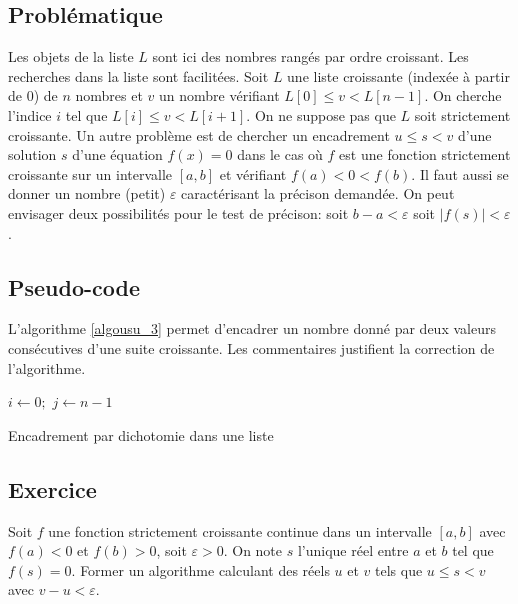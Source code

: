 \subsection{Problématique}
Les objets de la liste $L$ sont ici des nombres rangés par ordre croissant. Les recherches dans la liste sont facilitées.\newline
Soit $L$ une liste croissante (indexée à partir de 0) de $n$ nombres et $v$ un nombre vérifiant $L[0] \leq v < L[n-1]$. On cherche l'indice $i$ tel que $L[i]\leq v < L[i+1]$. On ne suppose pas que $L$ soit strictement croissante.\newline
Un autre problème est de chercher un encadrement $u\leq s < v$ d'une solution $s$ d'une équation $f(x)=0$ dans le cas où $f$ est une fonction strictement croissante sur un intervalle $[a,b]$ et vérifiant $f(a) < 0 < f(b)$. Il faut aussi se donner un nombre (petit) $\varepsilon$ caractérisant la précison demandée. On peut envisager deux possibilités pour le test de précison: soit $b-a < \varepsilon$ soit $|f(s)|< \varepsilon$.
\subsection{Pseudo-code}
L'algorithme \ref{algousu_3} permet d'encadrer un nombre donné par deux valeurs consécutives d'une suite croissante. Les commentaires justifient la correction de l'algorithme.
\begin{algorithm}
  $i\leftarrow 0; $ 
  $j\leftarrow n-1$\;
  \caption{Encadrement par dichotomie dans une liste}
  \label{algousu_3}
\end{algorithm}

\subsection{Exercice}
Soit $f$ une fonction strictement croissante continue dans un intervalle $[a,b]$ avec $f(a)<0$ et $f(b)>0$, soit $\varepsilon>0$. On note $s$ l'unique réel entre $a$ et $b$ tel que $f(s)=0$. Former un algorithme calculant des réels $u$ et $v$ tels que $u\leq s < v$ avec $v-u < \varepsilon$.  


